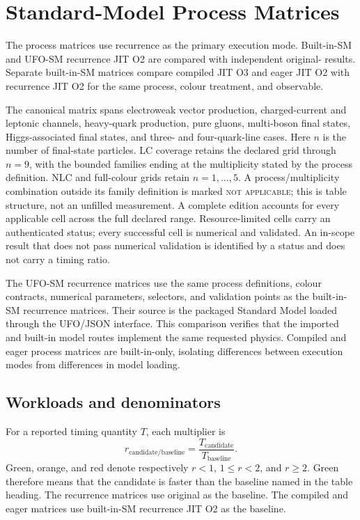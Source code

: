 \section{Standard-Model Process Matrices}
\label{sec:three-mode-performance-tables}

The process matrices use recurrence as the primary \PAC{} execution mode.
Built-in-SM and UFO-SM recurrence JIT O2 are compared with independent
original-\AC{} results.  Separate built-in-SM matrices compare compiled JIT O3
and eager JIT O2 with recurrence JIT O2 for the same process, colour treatment,
and observable.

The canonical matrix spans electroweak vector production, charged-current and
leptonic channels, heavy-quark production, pure gluons, multi-boson final
states, Higgs-associated final states, and three- and four-quark-line cases.
Here \(n\) is the number of final-state particles.  LC coverage retains the
declared grid through \(n=9\), with the bounded families ending at the
multiplicity stated by the process definition.  NLC and full-colour grids
retain \(n=1,\ldots,5\).  A process/multiplicity combination outside its family
definition is marked \textsc{not applicable}; this is table structure, not an
unfilled measurement.  A complete edition accounts for every applicable cell
across the full declared range.  Resource-limited cells carry an authenticated
status; every successful cell is numerical and validated.  An in-scope result
that does not pass numerical validation is identified by a status and does
not carry a timing ratio.

The UFO-SM recurrence matrices use the same process definitions, colour
contracts, numerical parameters, selectors, and validation points as the
built-in-SM recurrence matrices. Their source is the packaged Standard Model
loaded through the UFO/JSON interface. This comparison verifies that the
imported and built-in model routes implement the same requested physics.
Compiled and eager process matrices are built-in-only, isolating differences
between execution modes from differences in model loading.



\subsection*{Workloads and denominators}

For a reported timing quantity \(T\), each multiplier is
\begin{equation}
  r_{\mathrm{candidate/baseline}}
  = \frac{T_{\mathrm{candidate}}}{T_{\mathrm{baseline}}}.
  \label{eq:three-mode-matrix-time-ratio}
\end{equation}
Green, orange, and red denote respectively \(r<1\), \(1\leq r<2\), and
\(r\geq2\).  Green therefore means that the candidate is faster than the
baseline named in the table heading.  The recurrence matrices use original
\AC{} as the baseline.  The compiled and eager matrices use built-in-SM
recurrence JIT O2 as the baseline.

